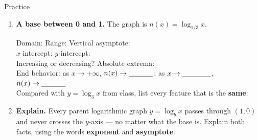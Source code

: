\documentclass[10pt]{article}
\newcommand{\lgrid}[4]{%
  \draw[step=1, linegray!40, very thin] (#1,#3) grid (#2,#4);
  \draw[->, semithick, charcoal] (#1,0)--(#2,0) node[below right, font=\scriptsize]{$x$};
  \draw[->, semithick, charcoal] (0,#3)--(0,#4) node[left, font=\scriptsize]{$y$};}
\newcommand{\logcurve}[5]{\draw[very thick, forest, domain=#4:#5, samples=120, smooth]
  plot ({pow(#1,\x-(#3))+(#2)},{\x});}
\begin{document}
\begin{notesbox}{Practice}
\begin{enumerate}[leftmargin=1.9em, itemsep=12pt]
  \item \textbf{A base between 0 and 1.} The graph is $n(x) = \log_{1/3} x$.
    \begin{center}
    \end{center}
    Domain: \blank{3.0cm} \quad Range: \blank{3.0cm} \quad Vertical asymptote: \blank{2.0cm} \\[3pt]
    $x$-intercept: \blank{1.8cm} \quad $y$-intercept: \blank{1.8cm} \\[3pt]
    Increasing or decreasing? \blank{2.4cm} \quad Absolute extrema: \blank{2.4cm} \\[3pt]
    End behavior: as $x\to+\infty$, $n(x)\to\blank{1.2cm}$; \; as $x\to\blank{1.4cm}$,
    $n(x)\to\blank{1.2cm}$ \\[3pt]
    Compared with $y=\log_3 x$ from class, list every feature that is the \textbf{same}:
    \blank{5.0cm}

  \item \textbf{Explain.} Every parent logarithmic graph $y=\log_b x$ passes through $(1,0)$ and
        never crosses the $y$-axis --- no matter what the base is. Explain both facts, using the
        words \textbf{exponent} and \textbf{asymptote}.
\end{enumerate}
\end{notesbox}
\end{document}
